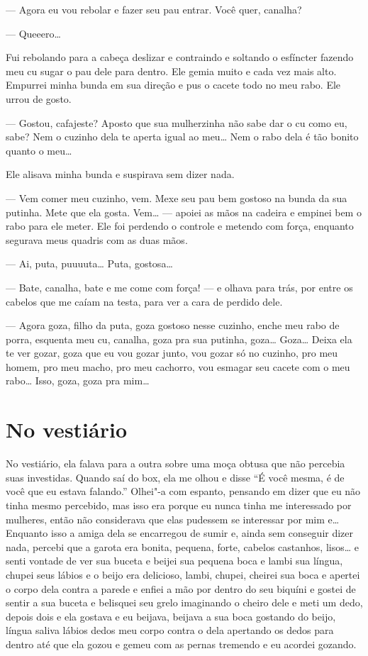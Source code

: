 --- Agora eu vou rebolar e fazer seu pau entrar. Você quer, canalha?

--- Queeero…

Fui rebolando para a cabeça deslizar e contraindo e soltando o esfíncter
fazendo meu cu sugar o pau dele para dentro. Ele gemia muito e cada vez
mais alto. Empurrei minha bunda em sua direção e pus o cacete todo no
meu rabo. Ele urrou de gosto.

--- Gostou, cafajeste? Aposto que sua mulherzinha não sabe dar o cu como
eu, sabe? Nem o cuzinho dela te aperta igual ao meu… Nem o rabo
dela é tão bonito quanto o meu…

Ele alisava minha bunda e suspirava sem dizer nada.

--- Vem comer meu cuzinho, vem. Mexe seu pau bem gostoso na bunda da sua
putinha. Mete que ela gosta. Vem… --- apoiei as mãos na cadeira e
empinei bem o rabo para ele meter. Ele foi perdendo o controle e metendo
com força, enquanto segurava meus quadris com as duas mãos.

--- Ai, puta, puuuuta… Puta, gostosa…

--- Bate, canalha, bate e me come com força! --- e olhava para trás, por
entre os cabelos que me caíam na testa, para ver a cara de perdido dele.

--- Agora goza, filho da puta, goza gostoso nesse cuzinho, enche meu
rabo de porra, esquenta meu cu, canalha, goza pra sua putinha,
goza… Goza… Deixa ela te ver gozar, goza que eu vou gozar
junto, vou gozar só no cuzinho, pro meu homem, pro meu macho, pro meu
cachorro, vou esmagar seu cacete com o meu rabo… Isso, goza, goza
pra mim…

\chapter{No vestiário}

No vestiário, ela falava para a outra sobre uma moça obtusa que não
percebia suas investidas. Quando saí do box, ela me olhou e disse ``É
você mesma, é de você que eu estava falando.'' Olhei"-a com espanto,
pensando em dizer que eu não tinha mesmo percebido, mas isso era porque
eu nunca tinha me interessado por mulheres, então não considerava que
elas pudessem se interessar por mim e… Enquanto isso a amiga dela
se encarregou de sumir e, ainda sem conseguir dizer nada, percebi que a
garota era bonita, pequena, forte, cabelos castanhos, lisos… e
senti vontade de ver sua buceta e beijei sua pequena boca e lambi sua
língua, chupei seus lábios e o beijo era delicioso, lambi, chupei,
cheirei sua boca e apertei o corpo dela contra a parede e enfiei a mão
por dentro do seu biquíni e gostei de sentir a sua buceta e belisquei
seu grelo imaginando o cheiro dele e meti um dedo, depois dois e ela
gostava e eu beijava, beijava a sua boca gostando do beijo, língua
saliva lábios dedos meu corpo contra o dela apertando os dedos para
dentro até que ela gozou e gemeu com as pernas tremendo e eu acordei
gozando.

